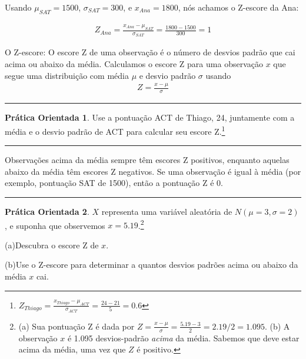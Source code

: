 \documentclass[
]{book}
\theoremstyle{definition}
\theoremstyle{definition}
\theoremstyle{definition}
\newtheorem{exercise}{Prática Orientada}[chapter]
\theoremstyle{definition}
\theoremstyle{remark}
\begin{document}
Usando \(\mu_{SAT}=1500\), \(\sigma_{SAT}=300\), e \(x_{Ana}=1800\), nós achamos o Z-escore da Ana:

\begin{eqnarray*}
Z_{Ana} = \frac{x_{Ana} - \mu_{SAT}}{\sigma_{SAT}} = \frac{1800-1500}{300} = 1
\end{eqnarray*}

O Z-escore: O escore Z de uma observação é o número de desvios padrão que cai acima ou abaixo da média. Calculamos o escore Z para uma observação \(x\) que segue uma distribuição com média \(\mu\) e desvio padrão \(\sigma\) usando
\begin{eqnarray*}
Z = \frac{x-\mu}{\sigma}
\end{eqnarray*}

\begin{center}\rule{0.5\linewidth}{0.5pt}\end{center}

\begin{exercise}
\protect\hypertarget{exr:unnamed-chunk-85}{}{\label{exr:unnamed-chunk-85} }Use a pontuação ACT de Thiago, 24, juntamente com a média e o desvio padrão de ACT para calcular seu escore Z.\footnote{\(Z_{Thiago} = \frac{x_{Thiago} - \mu_{ACT}}{\sigma_{ACT}} = \frac{24 - 21}{5} = 0.6\)}
\end{exercise}

\begin{center}\rule{0.5\linewidth}{0.5pt}\end{center}

Observações acima da média sempre têm escores Z positivos, enquanto aquelas abaixo da média têm escores Z negativos. Se uma observação é igual à média (por exemplo, pontuação SAT de 1500), então a pontuação Z é \(0\).

\begin{center}\rule{0.5\linewidth}{0.5pt}\end{center}

\begin{exercise}
\protect\hypertarget{exr:unnamed-chunk-86}{}{\label{exr:unnamed-chunk-86} }\(X\) representa uma variável aleatória de \(N(\mu=3, \sigma=2)\), e suponha que observemos \(x=5.19\).\footnote{(a) Sua pontuação Z é dada por \(Z = \frac{x-\mu}{\sigma} = \frac{5.19 - 3}{2} = 2.19/2 = 1.095\). (b) A observação \(x\) é 1.095 desvios-padrão \emph{acima} da média. Sabemos que deve estar acima da média, uma vez que \(Z\) é positivo.}

(a)Descubra o escore Z de \(x\).

(b)Use o Z-escore para determinar a quantos desvios padrões acima ou abaixo da média \(x\) cai.
\end{exercise}
\end{document}
